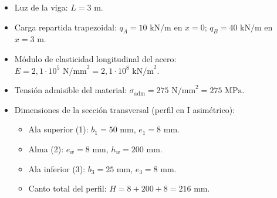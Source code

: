 \begin{tcolorbox}[colback=blue!5!white,colframe=blue!75!black,title=\textbf{Datos del Problema}]
    \begin{itemize}
        \item Luz de la viga: $L = 3\text{ m}$.
        \item Carga repartida trapezoidal: $q_A = 10\text{ kN/m}$ en $x = 0$; $q_B = 40\text{ kN/m}$ en $x = 3\text{ m}$.
        \item Módulo de elasticidad longitudinal del acero: $E = 2{,}1 \cdot 10^5\text{ N/mm}^2 = 2{,}1 \cdot 10^8\text{ kN/m}^2$.
        \item Tensión admisible del material: $\sigma_{\text{adm}} = 275\text{ N/mm}^2 = 275\text{ MPa}$.
        \item Dimensiones de la sección transversal (perfil en I asimétrico):
              \begin{itemize}
                  \item Ala superior (1): $b_1 = 50\text{ mm}$, $e_1 = 8\text{ mm}$.
                  \item Alma (2): $e_w = 8\text{ mm}$, $h_w = 200\text{ mm}$.
                  \item Ala inferior (3): $b_3 = 25\text{ mm}$, $e_3 = 8\text{ mm}$.
                  \item Canto total del perfil: $H = 8 + 200 + 8 = 216\text{ mm}$.
              \end{itemize}
    \end{itemize}
\end{tcolorbox}

